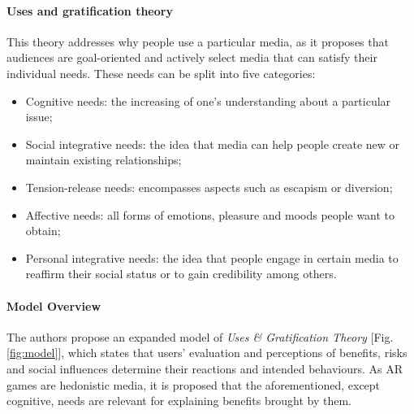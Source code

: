 \documentclass[runningheads]{llncs}
\begin{document}
\paragraph{Uses and gratification theory} This theory addresses why people use a particular media, as it proposes that audiences are goal-oriented and actively select media that can satisfy their individual needs. These needs can be split into five categories:
\begin{itemize}
    \item Cognitive needs: the increasing of one's understanding about a particular issue;
    \item Social integrative needs: the idea that media can help people create new or maintain existing relationships;
    \item Tension-release needs: encompasses aspects such as escapism or diversion;
    \item Affective needs: all forms of emotions, pleasure and moods people want to obtain;
    \item Personal integrative needs: the idea that people engage in certain media to reaffirm their social status or to gain credibility among others. 
\end{itemize}


\paragraph{Model Overview} The authors propose an expanded model of \textit{Uses \& Gratification Theory} [Fig.\ref{fig:model}], which states that users' evaluation and perceptions of benefits, risks and social influences determine their reactions and intended behaviours. As AR games are hedonistic media, it is proposed that the aforementioned, except cognitive, needs are relevant for explaining benefits brought by them.
\end{document}
